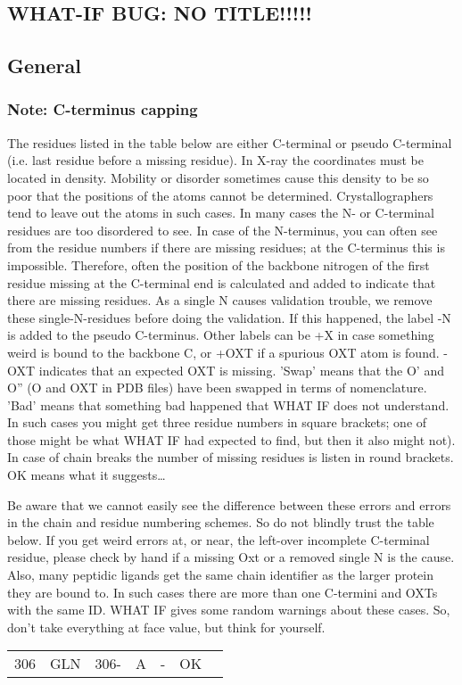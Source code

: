 \documentclass[a4paper]{article}
\def\showsect#1{
  \thesect\gdef\thesect{}
  \thessect\gdef\thessect{}
  \subsubsection{#1}
}
\gdef\thesect{\pagebreak[2]\section{WHAT-IF BUG: NO TITLE!!!!!}}
\gdef\thessect{\subsection{General}}
\begin{document}
\begin{note}
\showsect{Note: C-terminus capping}
The residues listed in the table below are either C-terminal or pseudo
C-terminal (i.e. last residue before a missing residue).
In X-ray the coordinates must be located in density. Mobility or disorder
sometimes cause this density to be so poor that the positions of the atoms
cannot be determined. Crystallographers tend to leave out the atoms in such
cases. In many cases the N- or C-terminal residues are too disordered to see.
In case of the N-terminus, you can often see from the residue numbers if
there are missing residues; at the C-terminus this is impossible. Therefore,
often the position of the backbone nitrogen of the first residue missing
at the C-terminal end is calculated and added to indicate that there
are missing residues. As a single N causes validation trouble, we remove
these single-N-residues before doing the validation. If this happened,
the label -N is added to the pseudo C-terminus. Other labels can be +X
in case something weird is bound to the backbone C, or +OXT if a spurious
OXT atom is found. -OXT indicates that an expected OXT is missing. 'Swap'
means that the O' and O'' (O and OXT in PDB files) have been swapped in
terms of nomenclature. 'Bad' means that something bad happened that WHAT IF
does not understand. In such cases you might get three residue numbers in
square brackets; one of those might be what WHAT IF had expected to find,
but then it also might not). In case of chain breaks the number of missing
residues is listen in round brackets. OK means what it suggests{\ldots}
 
Be aware that we cannot easily see the difference between these errors and
errors in the chain and residue numbering schemes. So do not blindly trust
the table below. If you get weird errors at, or near, the left-over
incomplete C-terminal residue, please check by hand if a missing Oxt or
a removed single N is the cause. Also, many peptidic ligands get the same
chain identifier as the larger protein they are bound to. In such cases there
are more than one C-termini and OXTs with the same ID. WHAT IF gives some
random warnings about these cases. So, don't take everything at face value,
but think for yourself.
 
\begin{center}
 
\begin{supertabular}{rr@{ (}r@{) }rlll}
  306&GLN & 306-&A &-       &OK\\
\end{supertabular}\end{center}
\end{note}
\end{document}
